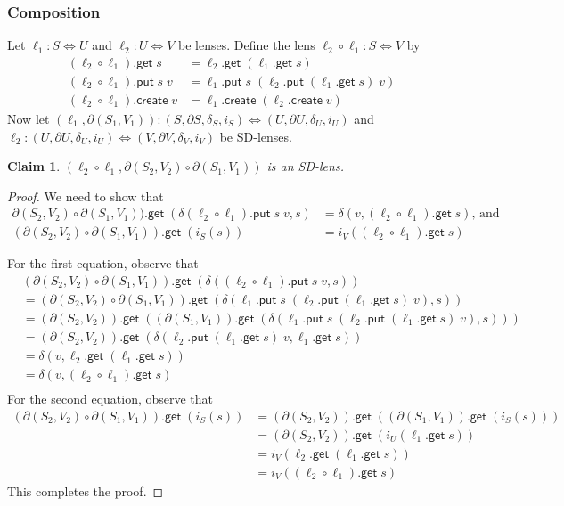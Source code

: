 \documentclass[acmsmall,review,anonymous]{acmart}\settopmatter{printfolios=true,printccs=false,printacmref=false}
\newtheorem{claim}{Claim}
\newcommand{\kw}[1]{\ensuremath{\mathsf{#1}}}
\newcommand{\get}{\ensuremath{\kw{get}}}
\newcommand{\pput}{\ensuremath{\kw{put}}}
\newcommand{\create}{\ensuremath{\kw{create}}}
\begin{document}
\subsubsection{Composition}
Let $\ell_1 : S \Leftrightarrow U$ and $\ell_2 : U \Leftrightarrow V$ be lenses.
Define the lens $\ell_2 \circ \ell_1 : S \Leftrightarrow V$ by
\begin{align*}
(\ell_2 \circ \ell_1).\get \; s &= \ell_2.\get \; (\ell_1.\get \; s)\\
(\ell_2 \circ \ell_1).\pput \; s \; v &= \ell_1.\pput \; s \; (\ell_2.\pput \;
(\ell_1.\get \; s) \; v) \\
(\ell_2 \circ \ell_1).\create \; v &= \ell_1.\create \; (\ell_2.\create \; v)
\end{align*}
Now let $(\ell_1, \partial (S_1, V_1)) : (S,
\partial S, \delta_S, i_{S}) \Leftrightarrow (U,
\partial U, \delta_U, i_{U})$ and $\ell_2 : (U,
\partial U, \delta_U, i_{U}) \Leftrightarrow (V,
\partial V, \delta_V, i_{V})$ be SD-lenses.
\begin{claim}
$(\ell_2 \circ \ell_1, \partial (S_2, V_2) \circ \partial (S_1, V_1))$ is an SD-lens.
\end{claim}
\begin{proof}
We need to show that
\begin{align}
\partial (S_2, V_2) \circ \partial (S_1, V_1)).\get \; (\delta(\ell_2 \circ
\ell_1).\pput \; s \; v, s)&= \delta(v, (\ell_2 \circ \ell_1).\get \; s)
\text{, and}\\
(\partial (S_2, V_2) \circ \partial (S_1, V_1)).\get \; (i_{S}(s)) &=
i_{V}((\ell_2 \circ \ell_1).\get \; s)
\end{align}

For the first equation, observe that
\begin{align*}
&(\partial (S_2, V_2) \circ \partial (S_1, V_1)).\get \; (\delta((\ell_2 \circ
\ell_1).\pput \; s \; v, s))\\
&=(\partial (S_2, V_2) \circ \partial (S_1, V_1)).\get \; (\delta(\ell_1.\pput
\; s \; (\ell_2.\pput \; (\ell_1.\get \; s) \; v), s))\\
&= (\partial (S_2, V_2)).\get \; ((\partial (S_1, V_1)).\get \; (\delta(\ell_1.\pput \;
s \; (\ell_2.\pput \; (\ell_1.\get \; s) \; v), s)))\\
&= (\partial (S_2, V_2)).\get \; (\delta(\ell_2.\pput \; (\ell_1.\get \; s) \; v,
\ell_1.\get \; s))\\
&= \delta(v, \ell_2.\get \; (\ell_1.\get \; s))\\
&= \delta(v, (\ell_2 \circ \ell_1).\get \; s)\\
\end{align*}
For the second equation, observe that
\begin{align*}
(\partial (S_2, V_2) \circ \partial (S_1, V_1)).\get \; (i_{S}(s)) &= 
(\partial (S_2, V_2)).\get \; ((\partial (S_1, V_1)).\get \; (i_{S}(s)))\\
&= (\partial (S_2, V_2)).\get \; (i_{U}(\ell_1.\get \; s))\\
&= i_{V}(\ell_2.\get \; (\ell_1.\get \; s))\\
&= i_{V}((\ell_2
\circ \ell_1).\get \; s)
\end{align*}
This completes the proof.
\end{proof}
\end{document}
